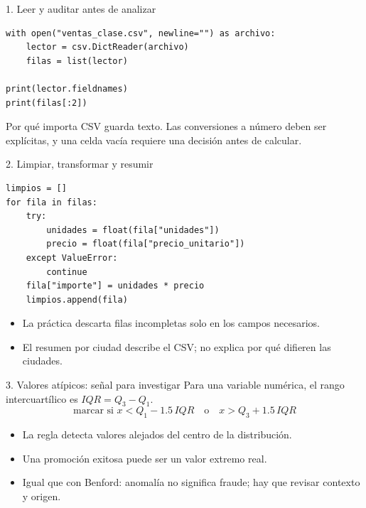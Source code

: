 \documentclass[aspectratio=169,11pt]{beamer}
\begin{document}
\begin{frame}[fragile]{1. Leer y auditar antes de analizar}
  \begin{lstlisting}[style=codigo]
with open("ventas_clase.csv", newline="") as archivo:
    lector = csv.DictReader(archivo)
    filas = list(lector)

print(lector.fieldnames)
print(filas[:2])
  \end{lstlisting}
  \begin{block}{Por qué importa}
    CSV guarda texto. Las conversiones a número deben ser explícitas, y una celda vacía requiere una decisión antes de calcular.
  \end{block}
\end{frame}

\begin{frame}[fragile]{2. Limpiar, transformar y resumir}
  \begin{lstlisting}[style=codigo]
limpios = []
for fila in filas:
    try:
        unidades = float(fila["unidades"])
        precio = float(fila["precio_unitario"])
    except ValueError:
        continue
    fila["importe"] = unidades * precio
    limpios.append(fila)
  \end{lstlisting}
  \begin{itemize}
    \item La práctica descarta filas incompletas solo en los campos necesarios.
    \item El resumen por ciudad describe el CSV; no explica por qué difieren las ciudades.
  \end{itemize}
\end{frame}

\begin{frame}{3. Valores atípicos: señal para investigar}
  Para una variable numérica, el rango intercuartílico es $IQR=Q_3-Q_1$.
  \[
    \text{marcar si } x < Q_1-1.5\,IQR
    \quad\text{o}\quad x > Q_3+1.5\,IQR
  \]
  \begin{itemize}
    \item La regla detecta valores alejados del centro de la distribución.
    \item Una promoción exitosa puede ser un valor extremo real.
    \item Igual que con Benford: anomalía no significa fraude; hay que revisar contexto y origen.
  \end{itemize}
\end{frame}
\end{document}
